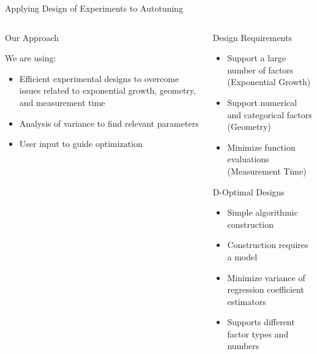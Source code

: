 \documentclass[10pt, compress, aspectratio=169, xcolor={table,usenames,dvipsnames}]{beamer}
\begin{document}
\begin{frame}[label={sec:orgd333167}]{Applying Design of Experiments to Autotuning}
\begin{columns}
\begin{column}{0.5\columnwidth}
\begin{block}{Our Approach}
\vspace{.2cm}

We are using:

\begin{itemize}
\item \alert{Efficient experimental designs} to overcome issues related to \alert{exponential growth}, \alert{geometry}, and \alert{measurement time}
\item \alert{Analysis of variance} to find \alert{relevant parameters}
\item \alert{User input} to guide optimization
\end{itemize}

\vspace{2cm}
\end{block}
\end{column}

\begin{column}{0.5\columnwidth}
\begin{block}{Design Requirements}
\begin{itemize}
\item Support a large number of factors (\alert{Exponential Growth})
\item Support numerical and categorical factors (\alert{Geometry})
\item Minimize function evaluations (\alert{Measurement Time})
\end{itemize}

\begin{block}{D-Optimal Designs}
\begin{itemize}
\item Simple \alert{algorithmic construction}
\item Construction requires a \alert{model}
\item Minimize \alert{variance} of \alert{regression coefficient estimators}
\item Supports different factor \alert{types} and \alert{numbers}
\end{itemize}
\end{block}
\end{block}
\end{column}
\end{columns}
\end{frame}
\end{document}
